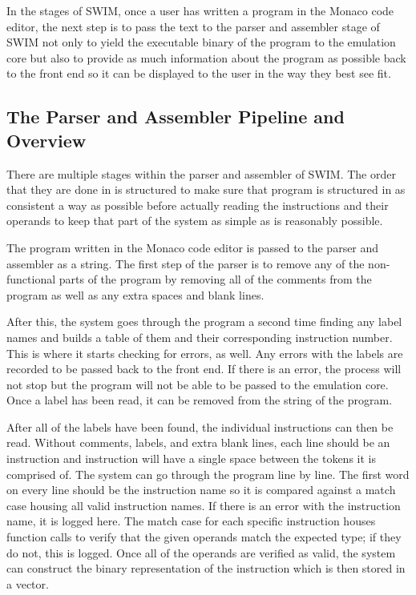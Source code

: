 \documentclass[parskip=half, fontsize=12pt]{scrartcl}
\begin{document}
In the stages of SWIM, once a user has written a program in the Monaco
code editor, the next step is to pass the text to the parser and
assembler stage of SWIM not only to yield the executable binary of the
program to the emulation core but also to provide as much information
about the program as possible back to the front end so it can be
displayed to the user in the way they best see fit.

\subsection{The Parser and Assembler Pipeline and Overview}

There are multiple stages within the parser and assembler of SWIM. The
order that they are done in is structured to make sure that program is
structured in as consistent a way as possible before actually reading
the instructions and their operands to keep that part of the system as
simple as is reasonably possible.

The program written in the Monaco code editor is passed to the parser
and assembler as a string. The first step of the parser is to remove any
of the non-functional parts of the program by removing all of the
comments from the program as well as any extra spaces and blank lines.

After this, the system goes through the program a second time finding
any label names and builds a table of them and their corresponding
instruction number. This is where it starts checking for errors, as
well. Any errors with the labels are recorded to be passed back to the
front end. If there is an error, the process will not stop but the
program will not be able to be passed to the emulation core. Once a
label has been read, it can be removed from the string of the program.

After all of the labels have been found, the individual instructions can
then be read. Without comments, labels, and extra blank lines, each line
should be an instruction and instruction will have a single space
between the tokens it is comprised of. The system can go through the
program line by line. The first word on every line should be the
instruction name so it is compared against a match case housing all
valid instruction names. If there is an error with the instruction name,
it is logged here. The match case for each specific instruction houses
function calls to verify that the given operands match the expected
type; if they do not, this is logged. Once all of the operands are
verified as valid, the system can construct the binary representation of
the instruction which is then stored in a vector.
\end{document}
